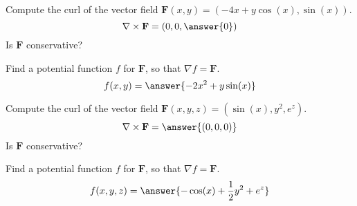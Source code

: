 \documentclass{ximera}
\begin{document}
\begin{problem}
Compute the curl of the vector field $\mathbf{F}(x,y) = (-4x+y\cos(x), \sin(x))$.
\[
\nabla\times\mathbf{F} = (0,0,\answer{0})
\]
Is $\mathbf{F}$ conservative?
\begin{multipleChoice}
\end{multipleChoice}
\begin{problem}
Find a potential function $f$ for $\mathbf{F}$, so that $\nabla f = \mathbf{F}$.
\[
f(x,y) = \answer{-2x^2+y\sin(x)}
\]
\end{problem}
\end{problem}

\begin{problem}
Compute the curl of the vector field $\mathbf{F}(x,y,z) = (\sin(x), y^2, e^z)$.
\[
\nabla\times\mathbf{F} = \answer{(0,0,0)}
\]
Is $\mathbf{F}$ conservative?
\begin{multipleChoice}
\end{multipleChoice}
\begin{problem}
Find a potential function $f$ for $\mathbf{F}$, so that $\nabla f = \mathbf{F}$.
\[
f(x,y,z) = \answer{-\cos(x)+\frac{1}{2}y^2+e^z}
\]
\end{problem}
\end{problem}
\end{document}
